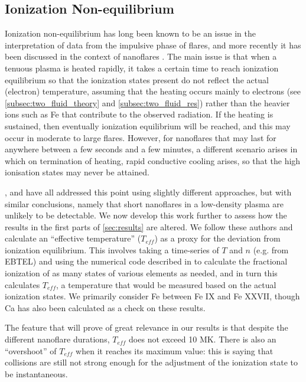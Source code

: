 \documentclass[apj]{emulateapj}
\begin{document}
	\subsection{Ionization Non-equilibrium}
	\label{subsec:nei_theory}
	\par Ionization non-equilibrium has long been known to be an issue in the interpretation of data from the impulsive phase of flares, and more recently it has been discussed in the context of nanoflares \citep{bradshaw_explosive_2006,reale_nonequilibrium_2008}. The main issue is that when a tenuous plasma is heated rapidly, it takes a certain time to reach ionization equilibrium so that the ionization states present do not reflect the actual (electron) temperature, assuming that the heating occurs mainly to electrons (see \autoref{subsec:two_fluid_theory} and \autoref{subsec:two_fluid_res}) rather than the heavier ions such as Fe that contribute to the observed radiation. If the heating is sustained, then eventually ionization equilibrium will be reached, and this may occur in moderate to large flares. However, for nanoflares that may last for anywhere between a few seconds and a few minutes, a different scenario arises in which on termination of heating, rapid conductive cooling arises, so that the high ionisation states may never be attained.
	\par \citet{bradshaw_explosive_2006}, \citet{reale_nonequilibrium_2008} and \citet{bradshaw_numerical_2009} have all addressed this point using slightly different approaches, but with similar conclusions, namely that short nanoflares in a low-density plasma are unlikely to be detectable. We now develop this work further to assess how the results in the first parts of \autoref{sec:results} are altered. We follow these authors and calculate an ``effective temperature'' ($T_{eff}$) as a proxy for the deviation from ionization equilibrium. This involves taking a time-series of $T$ and $n$ (e.g. from EBTEL) and using the numerical code described in \citet{bradshaw_numerical_2009} to calculate the fractional ionization of as many states of various elements as needed, and in turn this calculates $T_{eff}$, a temperature that would be measured based on the actual ionization states. We primarily consider Fe between Fe IX and Fe XXVII, though Ca has also been calculated as a check on these results.
	\par The feature that will prove of great relevance in our results is that despite the different nanoflare durations, $T_{eff}$ does not exceed 10 MK. There is also an ``overshoot'' of $T_{eff}$ when it reaches its maximum value: this is saying that collisions are still not strong enough for the adjustment of the ionization state to be instantaneous.
\end{document}
